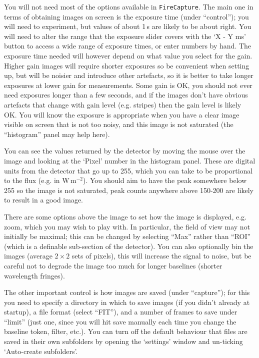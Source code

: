 \documentclass[11pt]{article}
\begin{document}
You will not need most of the options available in \texttt{FireCapture}. The main one in terms of obtaining images on screen is the exposure time (under ``control''); you will need to experiment, but values of about 1\,s are likely to be about right. You will need to alter the range that the exposure slider covers with the `X - Y ms' button to access a wide range of exposure times, or enter numbers by hand. The exposure time needed will however depend on what value you select for the gain. Higher gain images will require shorter exposures so be convenient when setting up, but will be noisier and introduce other artefacts, so it is better to take longer exposures at lower gain for measurements. Some gain is OK, you should not ever need exposures longer than a few seconds, and if the images don't have obvious artefacts that change with gain level (e.g. stripes) then the gain level is likely OK. You will know the exposure is appropriate when you have a clear image visible on screen that is not too noisy, and this image is not saturated (the ``histogram'' panel may help here).

You can see the values returned by the detector by moving the mouse over the image and looking at the `Pixel' number in the histogram panel. These are digital units from the detector that go up to 255, which you can take to be proportional to the flux (e.g. in W\,m$^{-2}$). You should aim to have the peak somewhere below 255 so the image is not saturated, peak counts anywhere above 150-200 are likely to result in a good image.

There are some options above the image to set how the image is displayed, e.g. zoom, which you may wish to play with. In particular, the field of view may not initially be maximal; this can be changed by selecting ``Max'' rather than ``ROI'' (which is a definable sub-section of the detector). You can also optionally bin the images (average $2 \times 2$ sets of pixels), this will increase the signal to noise, but be careful not to degrade the image too much for longer baselines (shorter wavelength fringes).

The other important control is how images are saved (under ``capture''); for this you need to specify a directory in which to save images (if you didn't already at startup), a file format (select ``FIT''), and a number of frames to save under ``limit'' (just one, since you will hit save manually each time you change the baseline token, filter, etc.). You can turn off the default behaviour that files are saved in their own subfolders by opening the `settings' window and un-ticking `Auto-create subfolders'.
\end{document}
